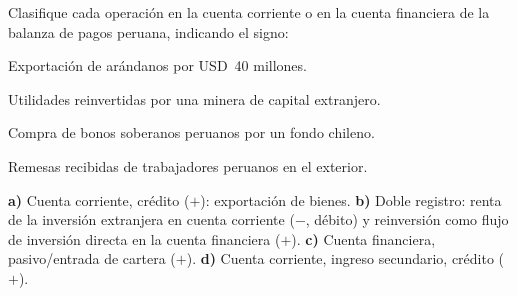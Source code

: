 \documentclass[soluciones]{academic-exam}
\begin{document}
\begin{pregunta}
Clasifique cada operación en la cuenta corriente o en la cuenta
financiera de la balanza de pagos peruana, indicando el signo:
\begin{apartados}
  \item Exportación de arándanos por USD~40 millones.
  \item Utilidades reinvertidas por una minera de capital extranjero.
  \item Compra de bonos soberanos peruanos por un fondo chileno.
  \item Remesas recibidas de trabajadores peruanos en el exterior.
\end{apartados}
\begin{solucion}
\textbf{a)} Cuenta corriente, crédito ($+$): exportación de bienes.
\textbf{b)} Doble registro: renta de la inversión extranjera en cuenta
corriente ($-$, débito) y reinversión como flujo de inversión directa en
la cuenta financiera ($+$).
\textbf{c)} Cuenta financiera, pasivo/entrada de cartera ($+$).
\textbf{d)} Cuenta corriente, ingreso secundario, crédito ($+$).
\end{solucion}
\end{pregunta}
\end{document}
